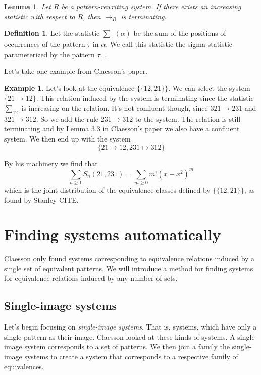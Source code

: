 \documentclass[openany, a4paper, 11pt, english]{article}
\newcommand{\breath}{\vspace{6pt plus 2pt minus 1pt}\noindent}
\newcommand{\patternrule}{ \mapsto \!}
\newtheorem{lemma}[theorem]{Lemma}
\theoremstyle{definition}
\newtheorem{definition}[theorem]{Definition}
\newtheorem{example}[theorem]{Example}
\newcommand{\Sym}{S}
\begin{document}
\begin{lemma}
    Let $R$ be a pattern-rewriting system. If there exists an increasing
    statistic with respect to $R$, then $\to_R$ is terminating.    
\end{lemma}

\begin{definition}
    Let the statistic $\sum_\tau(\alpha)$ be the sum of the positions of occurrences of
    the pattern $\tau$ in $\alpha$. We call this statistic the sigma statistic
    parameterized by the pattern $\tau$.
    \cite{claesson:2021}.
\end{definition}

Let's take one example from Claesson's paper.
\begin{example}
    Let's look at the equivalence $\{ \{ 12, 21 \} \}$. We can select the system $\{
        21 \to 12 \}$. This relation induced by the system is terminating since the statistic
    $\sum_{12}$ is increasing on the relation. It's not
    confluent though, since $321 \to 231$ and $321 \to 312$. So we add the rule
    $231 \patternrule 312$ to the system. The relation is still terminating and by Lemma
    3.3 in Claesson's paper we also have a confluent system. We then end up with
    the system 
    \[
        \{ 21 \patternrule 12, 231 \patternrule 312 \}
    \]

    \breath

    By his machinery we find that 
    \[
        \sum_{n \geq 1} \Sym_n(21, 231) = \sum_{m \geq 0} m!(x-x^2)^m
    \]
    which is the joint distribution of the equivalence classes defined by 
    $\{ \{ 12, 21 \} \}$, as found by Stanley CITE.
\end{example}

\section{Finding systems automatically}
Claesson only found systems corresponding to equivalence relations induced by a
single set of equivalent patterns. We will introduce a method for finding
systems for equivalence relations induced by any number of sets.

\subsection{Single-image systems}

Let's begin focusing on \emph{single-image systems}. That is, systems, which
have only a single pattern as their image. Claesson looked at these kinds
of systems. A single-image system corresponds to a set of patterns.
We then join a family the single-image systems to
create a system that corresponds to a respective family of equivalences.
\end{document}
